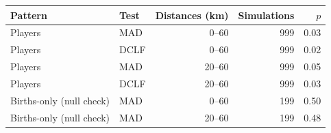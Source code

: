 \begin{tabular}{llrrr}
\toprule
Pattern & Test & Distances (km) & Simulations & $p$
\\
\midrule
Players & MAD & 0--60 & 999 & 0.03 \\
Players & DCLF & 0--60 & 999 & 0.02 \\
Players & MAD & 20--60 & 999 & 0.05 \\
Players & DCLF & 20--60 & 999 & 0.03 \\
Births-only (null check) & MAD & 0--60 & 199 & 0.50 \\
Births-only (null check) & MAD & 20--60 & 199 & 0.48 \\
\bottomrule
\end{tabular}
